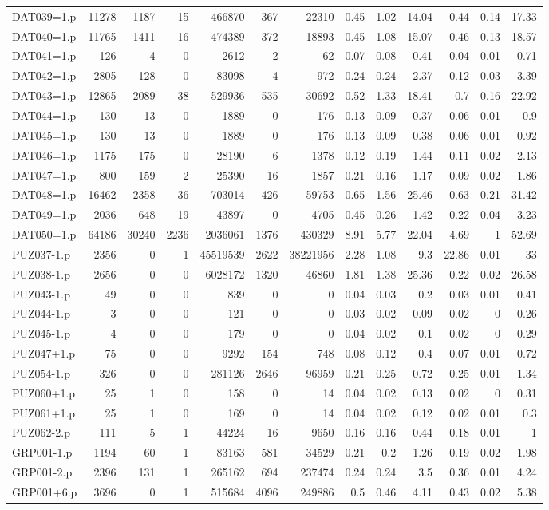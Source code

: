 \begin{table}[H]
\begin{adjustwidth}{-1.1in}{-0.5in}
\begin{tabular}{| l || r | r | r || r | r | r || r | r | r | r | r | r |}
DAT039=1.p&11278&1187&15&466870&367&22310&0.45&1.02&14.04&0.44&0.14&17.33\\
DAT040=1.p&11765&1411&16&474389&372&18893&0.45&1.08&15.07&0.46&0.13&18.57\\
DAT041=1.p&126&4&0&2612&2&62&0.07&0.08&0.41&0.04&0.01&0.71\\
DAT042=1.p&2805&128&0&83098&4&972&0.24&0.24&2.37&0.12&0.03&3.39\\
DAT043=1.p&12865&2089&38&529936&535&30692&0.52&1.33&18.41&0.7&0.16&22.92\\
DAT044=1.p&130&13&0&1889&0&176&0.13&0.09&0.37&0.06&0.01&0.9\\
DAT045=1.p&130&13&0&1889&0&176&0.13&0.09&0.38&0.06&0.01&0.92\\
DAT046=1.p&1175&175&0&28190&6&1378&0.12&0.19&1.44&0.11&0.02&2.13\\
DAT047=1.p&800&159&2&25390&16&1857&0.21&0.16&1.17&0.09&0.02&1.86\\
DAT048=1.p&16462&2358&36&703014&426&59753&0.65&1.56&25.46&0.63&0.21&31.42\\
DAT049=1.p&2036&648&19&43897&0&4705&0.45&0.26&1.42&0.22&0.04&3.23\\
DAT050=1.p&64186&30240&2236&2036061&1376&430329&8.91&5.77&22.04&4.69&1&52.69\\
PUZ037-1.p&2356&0&1&45519539&2622&38221956&2.28&1.08&9.3&22.86&0.01&33\\
PUZ038-1.p&2656&0&0&6028172&1320&46860&1.81&1.38&25.36&0.22&0.02&26.58\\
PUZ043-1.p&49&0&0&839&0&0&0.04&0.03&0.2&0.03&0.01&0.41\\
PUZ044-1.p&3&0&0&121&0&0&0.03&0.02&0.09&0.02&0&0.26\\
PUZ045-1.p&4&0&0&179&0&0&0.04&0.02&0.1&0.02&0&0.29\\
PUZ047+1.p&75&0&0&9292&154&748&0.08&0.12&0.4&0.07&0.01&0.72\\
PUZ054-1.p&326&0&0&281126&2646&96959&0.21&0.25&0.72&0.25&0.01&1.34\\
PUZ060+1.p&25&1&0&158&0&14&0.04&0.02&0.13&0.02&0&0.31\\
PUZ061+1.p&25&1&0&169&0&14&0.04&0.02&0.12&0.02&0.01&0.3\\
PUZ062-2.p&111&5&1&44224&16&9650&0.16&0.16&0.44&0.18&0.01&1\\
GRP001-1.p&1194&60&1&83163&581&34529&0.21&0.2&1.26&0.19&0.02&1.98\\
GRP001-2.p&2396&131&1&265162&694&237474&0.24&0.24&3.5&0.36&0.01&4.24\\
GRP001+6.p&3696&0&1&515684&4096&249886&0.5&0.46&4.11&0.43&0.02&5.38\\

\end{tabular}
\end{adjustwidth}
\end{table}
